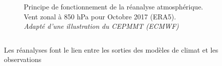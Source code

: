 \documentclass[aspectratio=169, usepdftitle=false, xcolor={dvipsnames}, 9pt,table]{beamer}
\begin{document}
\begin{frame}
\begin{columns}[c]
\begin{column}{0.5\textwidth}
\begin{figure}
                \caption{Principe de fonctionnement de la réanalyse atmosphérique.\\Vent zonal à 850 hPa pour Octobre 2017 (ERA5).\\\textit{Adapté d'une illustration du CEPMMT (ECMWF)}}
            \end{figure} 
        \end{column}
    \end{columns} 
    \begin{center}
        \begin{minipage}{12cm}
            \begin{definition}
                \centering
                \small
                Les réanalyses font le lien entre les sorties des modèles de climat et les observations
            \end{definition}
        \end{minipage}
    \end{center}
\end{frame}
\end{document}
